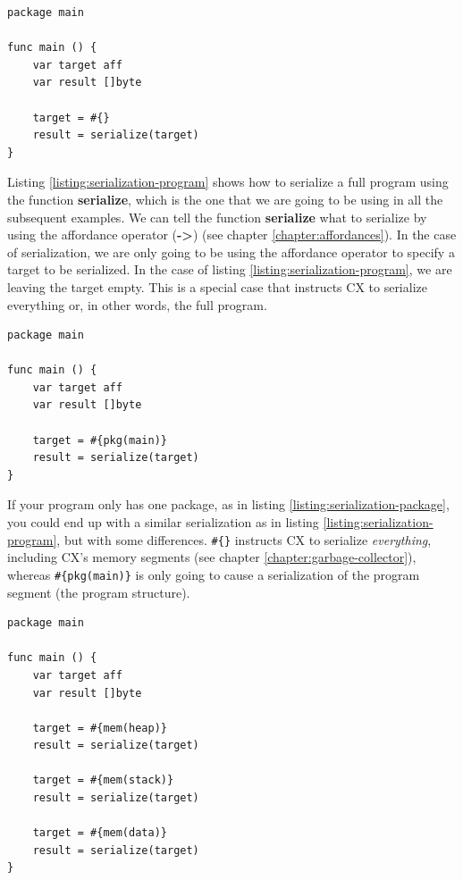 \documentclass[11pt,fleqn,openany]{book} %
\begin{document}
\begin{lstlisting}[caption={Serialization of a program},captionpos=b,label={listing:serialization-program}]
package main

func main () {
    var target aff
    var result []byte
    
    target = #{}
    result = serialize(target)
}
\end{lstlisting}

Listing \ref{listing:serialization-program} shows how to serialize a full program using the function \textbf{serialize}, which is the one that we are going to be using in all the subsequent examples. We can tell the function \textbf{serialize} what to serialize by using the affordance operator (\textbf{->}) (see chapter \ref{chapter:affordances}). In the case of serialization, we are only going to be using the affordance operator to specify a target to be serialized. In the case of listing \ref{listing:serialization-program}, we are leaving the target empty. This is a special case that instructs CX to serialize everything or, in other words, the full program.

\begin{lstlisting}[caption={Serialization of a package},captionpos=b,label={listing:serialization-package}]
package main

func main () {
    var target aff
    var result []byte
    
    target = #{pkg(main)}
    result = serialize(target)
}
\end{lstlisting}

If your program only has one package, as in listing \ref{listing:serialization-package}, you could end up with a similar serialization as in listing \ref{listing:serialization-program}, but with some differences. \lstinline|#{}| instructs CX to serialize \emph{everything}, including CX's memory segments (see chapter \ref{chapter:garbage-collector}), whereas \lstinline|#{pkg(main)}| is only going to cause a serialization of the program segment (the program structure).

\begin{lstlisting}[caption={Serialization of the memory segments},captionpos=b,label={listing:serialization-memory-segments}]
package main

func main () {
    var target aff
    var result []byte
    
    target = #{mem(heap)}
    result = serialize(target)
    
    target = #{mem(stack)}
    result = serialize(target)
    
    target = #{mem(data)}
    result = serialize(target)
}
\end{lstlisting}
\end{document}
